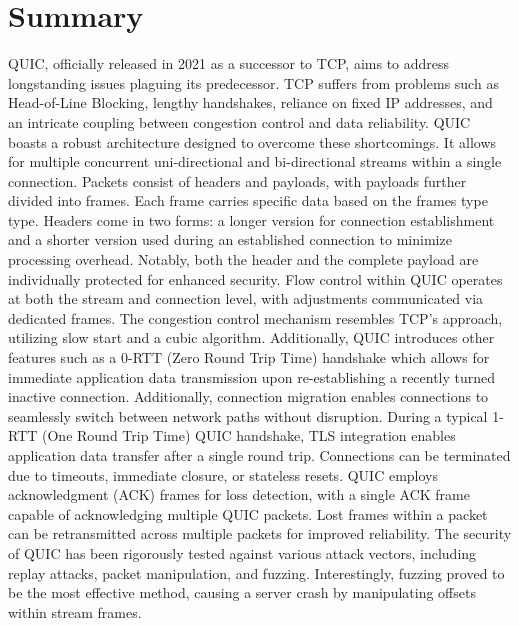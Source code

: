 \chapter{Summary}
QUIC, officially released in 2021 as a successor to TCP, aims to address longstanding issues plaguing its predecessor. TCP suffers
from problems such as Head-of-Line Blocking, lengthy handshakes, reliance on fixed IP addresses, and an intricate coupling between
congestion control and data reliability.
QUIC boasts a robust architecture designed to overcome these shortcomings. It allows for multiple concurrent uni-directional and
bi-directional streams within a single connection. Packets consist of headers and payloads, with payloads further divided into
frames. Each frame carries specific data based on the frames type type. Headers come in two forms: a longer version for connection
establishment and a shorter version used during an established connection to minimize processing overhead. Notably, both the header
and the complete payload are individually protected for enhanced security.
Flow control within QUIC operates at both the stream and connection level, with adjustments communicated via dedicated frames. The
congestion control mechanism resembles TCP's approach, utilizing slow start and a cubic algorithm. Additionally, QUIC introduces
other features such as a 0-RTT (Zero Round Trip Time) handshake which allows for immediate application data transmission upon
re-establishing a recently turned inactive connection. Additionally, connection migration enables connections to seamlessly
switch between network paths without disruption. During a typical 1-RTT (One Round Trip Time) QUIC handshake, TLS integration
enables application data transfer after a single round trip.
Connections can be terminated due to timeouts, immediate closure, or stateless resets. QUIC employs acknowledgment (ACK) frames for
loss detection, with a single ACK frame capable of acknowledging multiple QUIC packets. Lost frames within a packet can be retransmitted
across multiple packets for improved reliability. The security of QUIC has been rigorously tested against various attack vectors,
including replay attacks, packet manipulation, and fuzzing. Interestingly, fuzzing proved to be the most effective method, causing
a server crash by manipulating offsets within stream frames.

